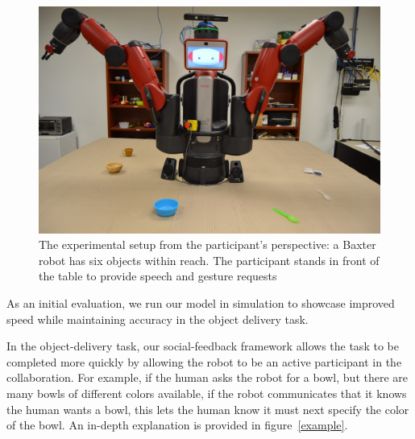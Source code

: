 \documentclass[conference]{IEEEtran}
\begin{document}
\begin{figure}[t]
	\begin{center}
		\includegraphics[scale=0.13]{resources/firstPerson}
		\caption{The experimental setup from the participant's perspective: a Baxter robot has six objects within reach. The participant stands in front of the table to provide speech and gesture requests}
	\end{center}
\end{figure}



As an initial evaluation, we run our model in simulation to showcase improved speed while maintaining accuracy in the object delivery task. 

In the object-delivery task, our social-feedback framework allows the task to be completed more quickly by allowing the robot to be an active participant in the collaboration. For example, if the human asks the robot for a bowl, but there are many bowls of different colors available, if the robot communicates that it knows the human wants a bowl, this lets the human know it must next specify the color of the bowl. An in-depth explanation is provided in figure~\ref{example}. 
\end{document}
